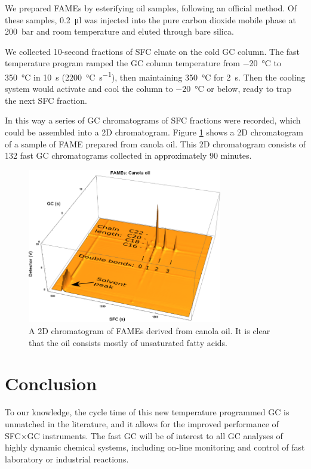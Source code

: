 \documentclass[aip,rsi,preprint,graphicx]{revtex4-1} %
\begin{document}
We prepared FAMEs by esterifying oil samples, following an official
method\cite{AOCS2017}. Of these samples, \SI{0.2}{\micro\litre} was injected
into the pure carbon dioxide mobile phase at \SI{200}{\bar} and room temperature
and eluted through bare silica.

We collected 10-second fractions of SFC eluate on the cold GC column. The fast
temperature program ramped the GC column temperature from \SI{-20}{\celsius} to
\SI{350}{\celsius} in \SI{10}{s} (\SI{2200}{\celsius\per\second}), then
maintaining \SI{350}{\celsius} for \SI{2}{\second}. Then the cooling system
would activate and cool the column to \SI{-20}{\celsius} or below, ready to trap
the next SFC fraction.

In this way a series of GC chromatograms of SFC fractions were recorded, which
could be assembled into a 2D chromatogram. Figure \ref{fig:2DChromatogram} shows
a 2D chromatogram of a sample of FAME prepared from canola oil. This 2D
chromatogram consists of 132 fast GC chromatograms collected in approximately 90
minutes.

\begin{figure}
\includegraphics[width=8.5cm]{./Figures/Interpretation.png}%

\caption{\label{fig:2DChromatogram}A 2D chromatogram of FAMEs derived from
canola oil. It is clear that the oil consists mostly of unsaturated fatty
acids.}%

\end{figure}

\section{Conclusion}

To our knowledge, the cycle time of this new temperature programmed GC is
unmatched in the literature, and it allows for the improved performance of
SFC×GC instruments. The fast GC will be of interest to all GC analyses of
highly dynamic chemical systems, including on-line monitoring and control of
fast laboratory or industrial reactions.
\end{document}
